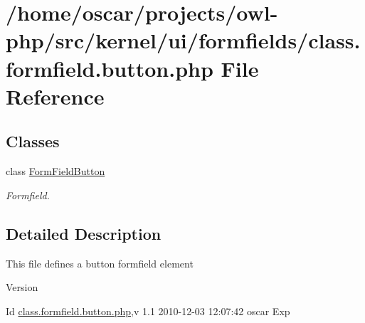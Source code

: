 \section{/home/oscar/projects/owl-\/php/src/kernel/ui/formfields/class.formfield.button.php File Reference}
\label{class_8formfield_8button_8php}
\subsection*{Classes}
\begin{DoxyCompactItemize}
\item 
class \hyperlink{classFormFieldButton}{FormFieldButton}
\begin{DoxyCompactList}\small\item\em Formfield. \item\end{DoxyCompactList}\end{DoxyCompactItemize}


\subsection{Detailed Description}
This file defines a button formfield element \begin{DoxyVersion}{Version}

\end{DoxyVersion}
\begin{DoxyParagraph}{Id}
\hyperlink{class_8formfield_8button_8php}{class.formfield.button.php},v 1.1 2010-\/12-\/03 12:07:42 oscar Exp 
\end{DoxyParagraph}
